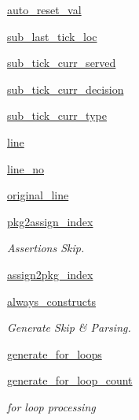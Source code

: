 \begin{DoxyCompactItemize}
\hyperlink{classsrc_1_1verilog__parser_1_1verilog__parser_ad751d762895cd27ae3de7b4adb34ee29}{auto\-\_\-reset\-\_\-val}
\item 
\hyperlink{classsrc_1_1verilog__parser_1_1verilog__parser_ac977e4adc51ad4604b1cb0c4f722d7ba}{sub\-\_\-last\-\_\-tick\-\_\-loc}
\item 
\hyperlink{classsrc_1_1verilog__parser_1_1verilog__parser_a3ab09c605608b1763a9d38d858598d1e}{sub\-\_\-tick\-\_\-curr\-\_\-served}
\item 
\hyperlink{classsrc_1_1verilog__parser_1_1verilog__parser_a31e7135de174cf37f497d1197f82b783}{sub\-\_\-tick\-\_\-curr\-\_\-decision}
\item 
\hyperlink{classsrc_1_1verilog__parser_1_1verilog__parser_abfb69b08a6d614d5c0da76f670f9047b}{sub\-\_\-tick\-\_\-curr\-\_\-type}
\item 
\hyperlink{classsrc_1_1verilog__parser_1_1verilog__parser_af8c49dd8d8b401c3a2eee7489ffa04e9}{line}
\item 
\hyperlink{classsrc_1_1verilog__parser_1_1verilog__parser_a33892150ed346c986314e42e8000c838}{line\-\_\-no}
\item 
\hyperlink{classsrc_1_1verilog__parser_1_1verilog__parser_a5233a3fc04bd927335ca10b2ff05e5f2}{original\-\_\-line}
\item 
\hyperlink{classsrc_1_1verilog__parser_1_1verilog__parser_a22d4873848308efa676a094cf71164fa}{pkg2assign\-\_\-index}
\begin{DoxyCompactList}\small\item\em Assertions Skip. \end{DoxyCompactList}\item 
\hyperlink{classsrc_1_1verilog__parser_1_1verilog__parser_a1182cf00e893bc40e432fefe69df4b7b}{assign2pkg\-\_\-index}
\item 
\hyperlink{classsrc_1_1verilog__parser_1_1verilog__parser_ab5ccb54f6c07eed5f249a6f7d736121c}{always\-\_\-constructs}
\begin{DoxyCompactList}\small\item\em Generate Skip \& Parsing. \end{DoxyCompactList}\item 
\hyperlink{classsrc_1_1verilog__parser_1_1verilog__parser_ae62ba26ec0f8a70e7feacd7546bac025}{generate\-\_\-for\-\_\-loops}
\item 
\hyperlink{classsrc_1_1verilog__parser_1_1verilog__parser_af691444ec4ff5f2e93254ed9b5dffdf3}{generate\-\_\-for\-\_\-loop\-\_\-count}
\begin{DoxyCompactList}\small\item\em for loop processing \end{DoxyCompactList}\item 

\end{DoxyCompactItemize}
